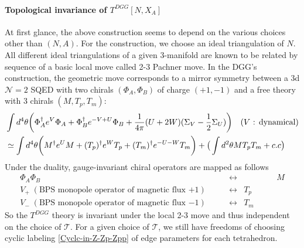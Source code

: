 \documentclass[a4paper,11pt]{article}
\def\cT{\mathcal{T}}
\begin{document}
\paragraph{Topological invariance of $T^{DGG}[N,X_A]$}  At first glance, the above construction seems to depend on the various choices other than $(N,A)$. For the construction, we  choose  an ideal triangulation of $N$.   
All different ideal triangulations of a given 3-manifold are known to be related by sequence of a basic local move called 2-3 Pachner move. In the DGG's construction, the geometric move corresponds to a mirror symmetry  between a 3d $\mathcal{N}=2$ SQED with two chirals $(\Phi_A, \Phi_B)$ of charge $(+1, -1)$ and a free theory with 3 chirals $(M, T_p, T_m)$:
%
\begin{align}
\begin{split}
&\int d^4 \theta  \bigg{(}\Phi_A^\dagger e^{V} \Phi_A +\Phi_B^\dagger e^{-V+U} \Phi_B +\frac{1}{4\pi} (U+ 2W) (\Sigma_{V}-\frac{1}2 \Sigma_U)\bigg{)} \quad (\textrm{$ V$ : dynamical})
\\
&\simeq \int d^4 \theta \bigg{(}   M^\dagger e^{U} M + (T_p)^\dagger e^{W} T_p + (T_m)^\dagger e^{-U-W} T_m \bigg{)} +\big{(}  \int d^2 \theta M T_p T_m +c.c \big{)}
\label{3d mirror-1}
\end{split}
\end{align}
%
Under the duality, gauge-invariant chiral operators  are mapped as follows
%
\begin{align} 
\Phi_A \Phi_B  \qquad \qquad \qquad \qquad  \qquad \quad &\leftrightarrow&  \qquad \qquad M  \nonumber
\\
V_+ \; (\textrm{BPS monopole operator of magnetic flux $+1$}) \qquad &\leftrightarrow &  T_p \label{3d mirror-2}
\\
V_- \; (\textrm{BPS monopole operator of magnetic flux $-1$}) \qquad &\leftrightarrow &  T_m \nonumber
\end{align}
%
So the $T^{DGG}$ theory is invariant under the local 2-3 move and thus independent on the choice of $\cT$.
For a given choice of $\cT$, we still have freedoms of choosing cyclic labeling \eqref{Cyclc-in-Z-Zp-Zpp} of edge parameters for each tetrahedron. 
%
\end{document}
